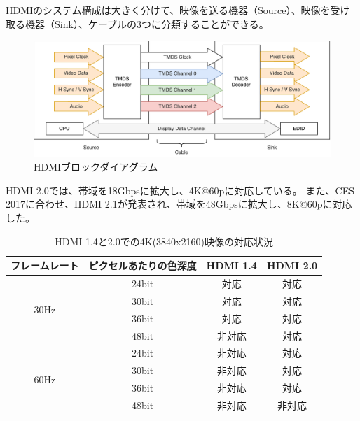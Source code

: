 HDMIのシステム構成は大きく分けて、映像を送る機器（Source）、映像を受け取る機器（Sink）、ケーブルの3つに分類することができる。

\begin{figure}[htbp]
  \begin{center}
    \includegraphics[bb=0 0 721 283,width=15cm]{img/hdmi-spec-structure.pdf}
  \end{center}
  \caption{HDMIブロックダイアグラム}
  \label{fig:hdmi-spec-structure}
\end{figure}

HDMI 2.0では、帯域を18Gbpsに拡大し、4K@60pに対応している。
また、CES 2017に合わせ、HDMI 2.1が発表され、帯域を48Gbpsに拡大し、8K@60pに対応した。

\begin{table}[htbp]
  \caption{HDMI 1.4と2.0での4K(3840x2160)映像の対応状況}
  \label{tb:video-bandwidth}
  \begin{center}
  \begin{tabular}{c|c|c|c}
    \hline
      フレームレート & ピクセルあたりの色深度 & HDMI 1.4 & HDMI 2.0\\\hline\hline
    \multirow{4}{*}{30Hz} &
        24bit & 対応   & 対応 \\\cline{2-4}
      & 30bit & 対応   & 対応 \\\cline{2-4}
      & 36bit & 対応   & 対応 \\\cline{2-4}
      & 48bit & 非対応 & 対応 \\\hline
    \multirow{4}{*}{60Hz} &
        24bit & 非対応 & 対応  \\\cline{2-4}
      & 30bit & 非対応 & 対応  \\\cline{2-4}
      & 36bit & 非対応 & 対応  \\\cline{2-4}
      & 48bit & 非対応 & 非対応 \\\hline
  \end{tabular}\end{center}
\end{table}

